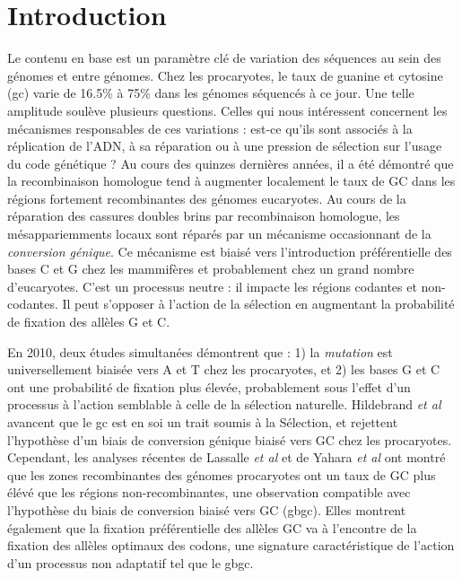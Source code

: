 \section*{Introduction}
\label{sec:introduction}


Le contenu en base est un paramètre clé de variation des séquences au sein des
génomes et entre génomes. Chez les procaryotes, le taux de guanine et cytosine
(\ac{gc}) varie de 16.5\% à 75\% dans les génomes séquencés à ce jour. Une telle
amplitude soulève plusieurs questions. Celles qui nous intéressent concernent
les mécanismes responsables de ces variations : est-ce qu'ils sont associés à la
réplication de l'ADN, à sa réparation ou à une pression de sélection sur l'usage
du code génétique ? Au cours des quinzes dernières années, il a été démontré que
la recombinaison homologue tend à augmenter localement le taux de GC dans les
régions fortement recombinantes des génomes
eucaryotes\cite{duret_biased_2009,lesecque_gc-biased_2013,williams_non-crossover_2015}.
Au cours de la réparation des cassures doubles brins par recombinaison
homologue, les mésappariemments locaux sont réparés par un mécanisme
occasionnant de la \emph{conversion génique}\cite{chen_gene_2007}. Ce mécanisme
est biaisé vers l'introduction préférentielle des bases C et G chez les
mammifères et probablement chez un grand nombre
d'eucaryotes\cite{pessia_evidence_2012}. C'est un processus neutre : il impacte
les régions codantes et non-codantes. Il peut s'opposer à l'action de la
sélection en augmentant la probabilité de fixation des allèles G et
C\cite{ratnakumar_detecting_2010}.

En 2010, deux études simultanées\cite{hildebrand_evidence_2010,
  hershberg_evidence_2010} démontrent que : 1) la \emph{mutation} est
universellement biaisée vers A et T chez les procaryotes, et 2) les bases G et C
ont une probabilité de fixation plus élevée, probablement sous l'effet d'un
processus à l'action semblable à celle de la sélection naturelle. Hildebrand
\emph{et al} avancent que le \ac{gc} est en soi un trait soumis à la Sélection,
et rejettent l'hypothèse d'un biais de conversion génique biaisé vers GC chez
les procaryotes. Cependant, les analyses récentes de Lassalle \emph{et al}
\cite{lassalle_gc-content_2015} et de Yahara \emph{et
  al}\cite{yahara_landscape_2016} ont montré que les zones recombinantes des
génomes procaryotes ont un taux de GC plus élévé que les régions
non-recombinantes, une observation compatible avec l'hypothèse du biais de
conversion biaisé vers GC (\ac{gbgc}). Elles montrent également que la fixation
préférentielle des allèles GC va à l'encontre de la fixation des allèles
optimaux des codons, une signature caractéristique de l'action d'un processus
non adaptatif tel que le \ac{gbgc}.

